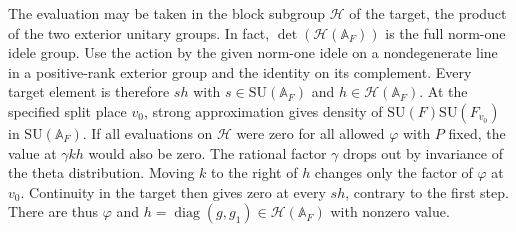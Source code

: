 The evaluation may be taken in the block subgroup
\(\mathcal H\) of the target, the product of the two exterior
unitary groups. In fact, \(\det(\mathcal H(\mathbb A_F))\)
is the full norm-one idele group. Use the action by the
given norm-one idele on a nondegenerate line in a positive-rank
exterior group and the identity on its complement. Every
target element is therefore \(s h\) with \(s\in\mathrm{SU}(\mathbb A_F)\)
and \(h\in\mathcal H(\mathbb A_F)\).
At the specified split place \(v_0\), strong approximation
gives density of \(\mathrm{SU}(F)\mathrm{SU}(F_{v_0})\) in
\(\mathrm{SU}(\mathbb A_F)\). If all evaluations on \(\mathcal H\)
were zero for all allowed \(\varphi\) with \(P\) fixed,
the value at \(\gamma k h\) would also be zero. The rational
factor \(\gamma\) drops out by invariance of the theta
distribution. Moving \(k\) to the right of \(h\) changes only
the factor of \(\varphi\) at \(v_0\). Continuity in the target
then gives zero at every \(s h\), contrary to the first step.
There are thus \(\varphi\) and
\(h=\operatorname{diag}(g,g_1)\in\mathcal H(\mathbb A_F)\)
with nonzero value.
\cite{p2platonov-strong-approximation}


